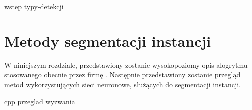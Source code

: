 {wstep}
{typy-detekcji}

\section{Metody segmentacji instancji}
\label{sec:metody_detekcji}

W niniejszym rozdziale, przedstawiony zostanie wysokopoziomy opis alogrytmu stosowanego obecnie przez firmę \blue{}. Następnie przedstawiony zostanie przegląd metod wykorzystujących sieci neuronowe, służących do segmentacji instancji.

{cpp}
{przeglad}
{wyzwania}
